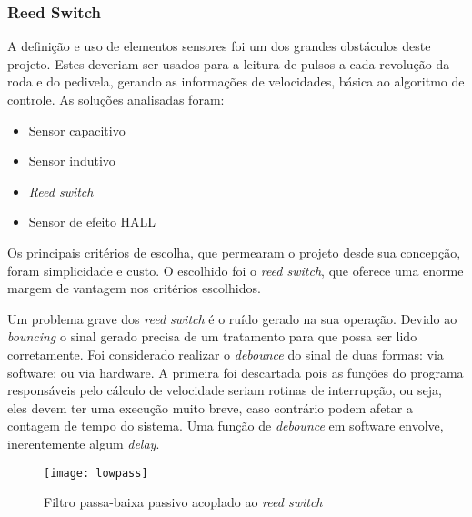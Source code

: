 \documentclass[a4paper,11pt]{article}
\begin{document}
\subsubsection{Reed Switch}
\label{sec:reed}
A definição e uso de elementos sensores foi um dos grandes obstáculos deste
projeto. Estes deveriam ser usados para a leitura de pulsos a cada revolução da
roda e do pedivela, gerando as informações de velocidades, básica ao algoritmo
de controle. As soluções analisadas foram:
\begin{itemize}
 \item Sensor capacitivo
 \item Sensor indutivo
 \item \textit{Reed switch}
 \item Sensor de efeito HALL
\end{itemize}
Os principais critérios de escolha, que permearam o projeto desde sua concepção,
foram simplicidade e custo. O escolhido foi o  \textit{reed switch}, que
oferece uma enorme margem de vantagem nos critérios escolhidos.

Um problema grave dos \textit{reed switch} é o ruído gerado na
sua operação. Devido ao \textit{bouncing}\cite{reed} o sinal gerado precisa de
um tratamento para que possa ser lido corretamente. Foi considerado realizar o
\textit{debounce} do sinal de duas formas: via software; ou via hardware. A
primeira foi descartada pois as funções do programa responsáveis pelo
cálculo de velocidade seriam rotinas de interrupção, ou seja, eles devem ter uma
execução muito breve, caso contrário podem afetar a contagem de tempo do
sistema. Uma função de \textit{debounce} em software envolve, inerentemente
algum \textit{delay}.

\begin{figure}[ht]
 \begin{center}
  \texttt{[image: lowpass]}
 \end{center}
 \caption{Filtro passa-baixa passivo acoplado ao \textit{reed switch}}
 \label{fig:lowpass}
\end{figure}
\end{document}
